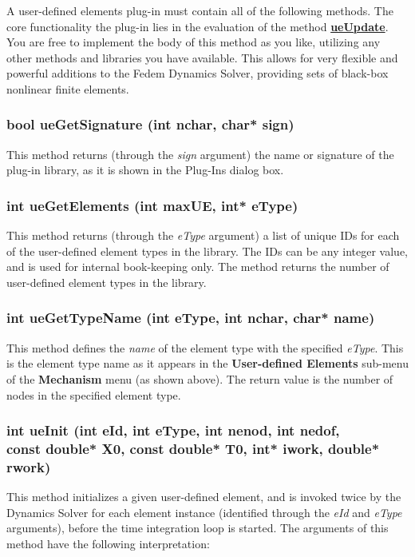 A user-defined elements plug-in must contain all of the following methods.
The core functionality the plug-in lies in the evaluation of the method
\protect\hyperlink{ueupdate}{\bf ueUpdate}.
You are free to implement the body of this method as you like, utilizing any
other methods and libraries you have available.
This allows for very flexible and powerful additions to the Fedem Dynamics
Solver, providing sets of black-box nonlinear finite elements.

\subsubsection{bool ueGetSignature (int nchar, char* sign)}

This method returns (through the {\sl sign} argument) the name or signature
of the plug-in library, as it is shown in the Plug-Ins dialog box.

\subsubsection{int ueGetElements (int maxUE, int* eType)}

This method returns (through the {\sl eType} argument) a list of unique
IDs for each of the user-defined element types in the library. The IDs
can be any integer value, and is used for internal book-keeping only.
The method returns the number of user-defined element types in the library.

\subsubsection{int ueGetTypeName (int eType, int nchar, char* name)}

This method defines the {\sl name} of the element type with the specified
{\sl eType}. This is the element type name as it appears in the
\textbf{User-defined Elements} sub-menu of the \textbf{Mechanism} menu
(as shown above). The return value is the number of nodes in the specified
element type.

\subsubsection{int ueInit (int eId, int eType, int nenod, int nedof, \\
  const double* X0, const double* T0, int* iwork, double* rwork)}

This method initializes a given user-defined element, and is invoked twice by
the Dynamics Solver for each element instance (identified through the {\sl eId}
and {\sl eType} arguments), before the time integration loop is started.
The arguments of this method have the following interpretation:


